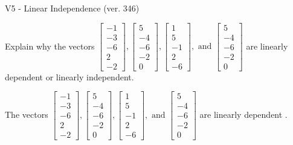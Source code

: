 \begin{exercise}
  \begin{exerciseTitle}V5 - Linear Independence (ver. 346)\end{exerciseTitle}
  \begin{exerciseStatement}
    Explain why the vectors \(\left[\begin{array}{r}
-1 \\
-3 \\
-6 \\
2 \\
-2
\end{array}\right] , \left[\begin{array}{r}
5 \\
-4 \\
-6 \\
-2 \\
0
\end{array}\right] , \left[\begin{array}{r}
1 \\
5 \\
-1 \\
2 \\
-6
\end{array}\right] , \text{ and } \left[\begin{array}{r}
5 \\
-4 \\
-6 \\
-2 \\
0
\end{array}\right]\) are linearly dependent or linearly independent.	


  \end{exerciseStatement}
  \begin{exerciseAnswer}
   The vectors \(\left[\begin{array}{r}
-1 \\
-3 \\
-6 \\
2 \\
-2
\end{array}\right] , \left[\begin{array}{r}
5 \\
-4 \\
-6 \\
-2 \\
0
\end{array}\right] , \left[\begin{array}{r}
1 \\
5 \\
-1 \\
2 \\
-6
\end{array}\right] , \text{ and } \left[\begin{array}{r}
5 \\
-4 \\
-6 \\
-2 \\
0
\end{array}\right]\) are 
  	 linearly dependent  .
  


  \end{exerciseAnswer}
\end{exercise}